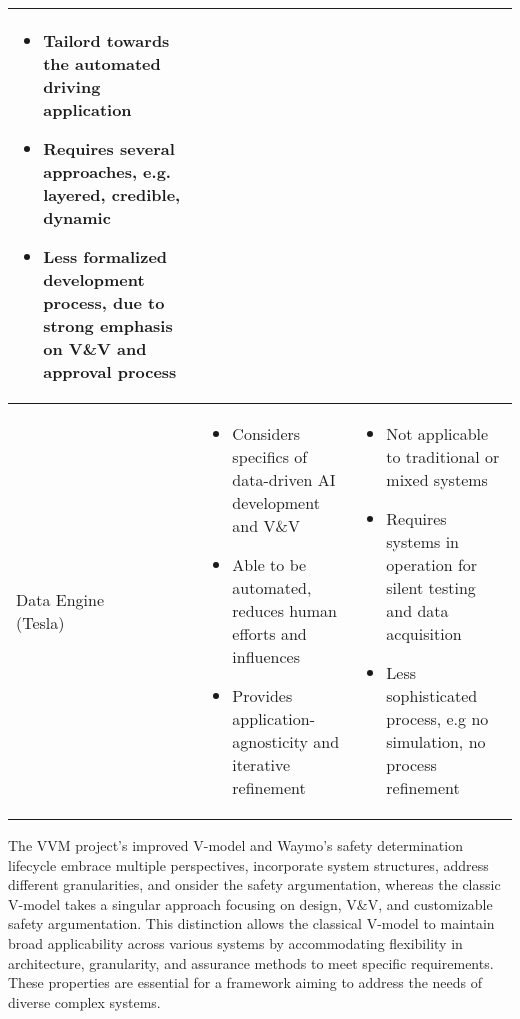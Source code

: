 \begin{table*}[]
\begin{tabularx}{\linewidth}{l *{2}{>{\raggedright\arraybackslash}X}}
		\begin{itemize}
			\item Tailord towards the automated driving application
			\item Requires several approaches, e.g. layered, credible, dynamic
			\item Less formalized development process, due to strong emphasis on V\&V and approval process
		\end{itemize}  \\
		\midrule
		\makecell[l]{Data Engine \\ \tiny{(Tesla)}} \vspace*{-0.4cm} &  \vspace*{-0.4cm}
		\begin{itemize}
			\item Considers specifics of data-driven AI development and V\&V 
			\item Able to be automated, reduces human efforts and influences
			\item Provides application-agnosticity and iterative refinement
		\end{itemize} \vspace*{-0.4cm} &  \vspace*{-0.4cm}
		\begin{itemize}
			\item Not applicable to traditional or mixed systems
			\item Requires systems in operation for silent testing and data acquisition
			\item Less sophisticated process, e.g no simulation, no process refinement
		\end{itemize}  \vspace*{-0.4cm} \\
		\bottomrule
	\end{tabularx}%
	\label{tab:compare_frameworks_ad_disad}
\end{table*}%

The VVM project's improved V-model \cite{VVMOverall} and Waymo's safety determination lifecycle \cite{favaro2023building} embrace multiple perspectives, incorporate system structures, address different granularities, and onsider the safety argumentation, whereas the classic V-model \cite{brohl1993v} takes a singular approach focusing on design, V\&V, and customizable safety argumentation. This distinction allows the classical V-model to maintain broad applicability across various systems by accommodating flexibility in architecture, granularity, and assurance methods to meet specific requirements. These properties are essential for a framework aiming to address the needs of diverse complex systems. 

